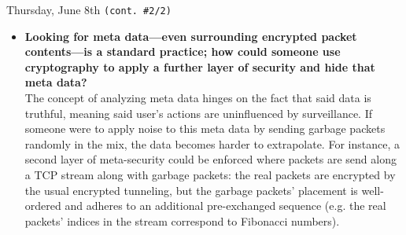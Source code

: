\documentclass[11pt]{article}
\begin{document}
\begin{orangebox}{Thursday, June 8th \hspace{0.2cm}\texttt{(cont. \#2/2)}\vspace{-2.2em}\begin{flushright}\end{flushright}}
\begin{itemize}
        \item\textbf{Looking for meta data---even surrounding encrypted packet contents---is a standard practice; how could someone use cryptography to apply a further layer of security and hide that meta data?} \\
        \phantom{~~~~} The concept of analyzing meta data hinges on the fact that said data is truthful, meaning said user's actions are uninfluenced by surveillance. If someone were to apply noise to this meta data by sending garbage packets randomly in the mix, the data becomes harder to extrapolate. For instance, a second layer of meta-security could be enforced where packets are send along a TCP stream along with garbage packets: the real packets are encrypted by the usual encrypted tunneling, but the garbage packets' placement is well-ordered and adheres to an additional pre-exchanged sequence (e.g. the real packets' indices in the stream correspond to Fibonacci numbers).
    \end{itemize}
\end{orangebox}

\begin{center}
    \vspace{-0.25em}
    \hspace{0.2cm}
    \vspace{-0.4em}
\end{center}
\end{document}
